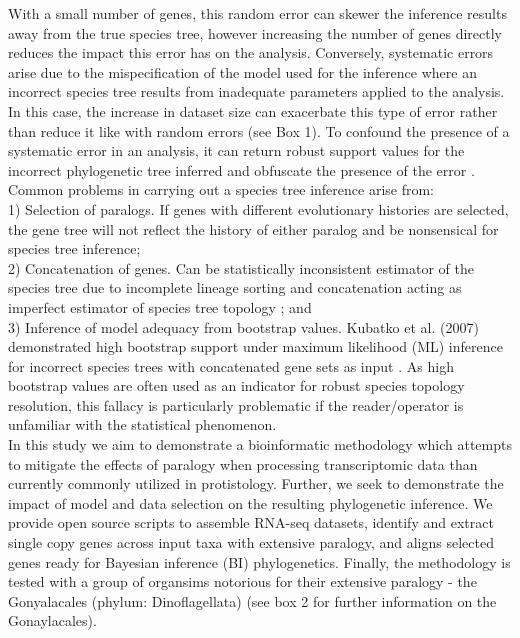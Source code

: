 \documentclass[12pt]{article}
\begin{document}
With a small number of genes, this random error can skewer the inference results away from the true species tree, however increasing the number of genes directly reduces the impact this error has on the analysis. 
Conversely, systematic errors arise due to the mispecification of the model used for the inference where an incorrect species tree results from inadequate parameters applied to the analysis. 
In this case, the increase in dataset size can exacerbate this type of error rather than reduce it like with random errors (see Box 1).  
To confound the presence of a systematic error in an analysis, it
 can return robust support values for the incorrect phylogenetic tree inferred and obfuscate the presence of the error \cite{jeffroy2006phylogenomics,roch2015likelihood,kubatko2007inconsistency}. 
Common problems in carrying out a species tree inference arise from:\\
1) Selection of paralogs. 
If genes with different evolutionary histories are selected, the gene tree will not reflect the history of either paralog and be nonsensical for species tree inference; \\
2) Concatenation of genes. 
Can be statistically inconsistent estimator of the species tree due to incomplete lineage sorting and concatenation acting as imperfect estimator of species tree topology \cite{roch2015likelihood}; and \\
3) Inference of model adequacy from bootstrap values. 
Kubatko et al. (2007) demonstrated high bootstrap support under maximum likelihood (ML) inference for incorrect species trees with concatenated gene sets as input \cite{kubatko2007inconsistency}. 
As high bootstrap values are often used as an indicator for robust species topology resolution, this fallacy is particularly problematic if the reader/operator is unfamiliar with the statistical phenomenon.\\
In this study we aim to demonstrate a bioinformatic methodology which attempts to mitigate the effects of paralogy when processing transcriptomic data than currently commonly utilized in protistology. 
Further, we seek to demonstrate the impact of model and data selection on the resulting phylogenetic inference. 
We provide open source scripts to assemble RNA-seq datasets, identify and extract single copy genes across input taxa with extensive paralogy, and aligns selected genes ready for Bayesian inference (BI) phylogenetics. 
Finally, the methodology is tested with a group of organsims notorious for their extensive paralogy - the Gonyalacales (phylum: Dinoflagellata) (see box 2 for further information on the Gonaylacales).
\end{document}
